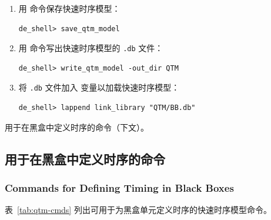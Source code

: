 \begin{enumerate}
  \item 用  命令保存快速时序模型：
\begin{lstlisting}
de_shell> save_qtm_model
\end{lstlisting}

  \item 用  命令写出快速时序模型的 \texttt{.db} 文件：
\begin{lstlisting}
de_shell> write_qtm_model -out_dir QTM
\end{lstlisting}

  \item 将 \texttt{.db} 文件加入  变量以加载快速时序模型：
\begin{lstlisting}
de_shell> lappend link_library "QTM/BB.db"
\end{lstlisting}
\end{enumerate}

\begin{seeAlsoBox}
用于在黑盒中定义时序的命令（下文）。
\end{seeAlsoBox}

\subsection{用于在黑盒中定义时序的命令}
\subsubsection*{Commands for Defining Timing in Black Boxes}

表~\ref{tab:qtm-cmds} 列出可用于为黑盒单元定义时序的快速时序模型命令。

